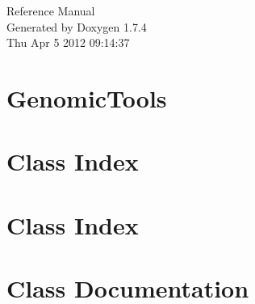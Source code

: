 \documentclass[a4paper]{book}
\begin{document}
\hypersetup{pageanchor=false}
\begin{titlepage}
\vspace*{7cm}
\begin{center}
{\Large Reference Manual}\\
\vspace*{1cm}
{\large Generated by Doxygen 1.7.4}\\
\vspace*{0.5cm}
{\small Thu Apr 5 2012 09:14:37}\\
\end{center}
\end{titlepage}
\clearemptydoublepage
{}
\tableofcontents
\clearemptydoublepage
{}
\hypersetup{pageanchor=true}
\chapter{GenomicTools}
\label{index}\hypertarget{index}{}
\chapter{Class Index}

\chapter{Class Index}

\chapter{Class Documentation}





















\printindex
\end{document}
